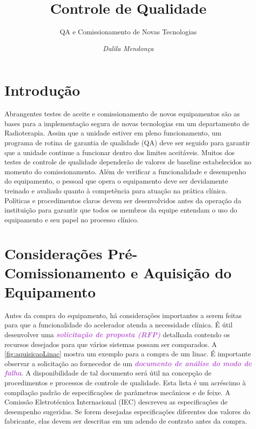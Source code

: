 \documentclass[11pt,a4paper]{article}
\title{\LobsterTwo\Huge{Controle de Qualidade}}
\author{\LobsterTwo\Large{QA e Comissionamento de Novas Tecnologias}\nocite{*}}
\date{\LobsterTwo\textit{Dalila Mendonça}}
\newcounter{exemplo}
\begin{document}
	\maketitle


\section{Introdução}

	Abrangentes testes de aceite e comissionamento de novos equipamentos são as bases para a implementação segura de novas tecnologias em um departamento de Radioterapia. Assim que a unidade estiver em pleno funcionamento, um programa de rotina de garantia de qualidade (QA) deve ser seguido para garantir que a unidade continue a funcionar dentro dos limites aceitáveis. Muitos dos testes de controle de qualidade dependerão de valores de baseline estabelecidos no momento do comissionamento. Além de verificar a funcionalidade e desempenho do equipamento, o pessoal que opera o equipamento deve ser devidamente treinado e avaliado quanto à competência para atuação na prática clínica. Políticas e procedimentos claros devem ser desenvolvidos antes da operação da instituição para garantir que todos os membros da equipe entendam o uso do equipamento e seu papel no processo clínico.

\section{Considerações Pré-Comissionamento e Aquisição do Equipamento}

	Antes da compra do equipamento, há considerações importantes a serem feitas para que a funcionalidade do acelerador atenda a necessidade clínica. É útil desenvolver uma \textcolor{MediumOrchid}{\textbf{\textit{solicitação de proposta (RFP)}}} detalhada contendo os recursos desejados para que vários sistemas possam ser comparados. A \ref{fig:aquisicaoLinac} mostra um exemplo para a compra de um linac. É importante observar a solicitação ao fornecedor de um \textcolor{MediumOrchid}{\textbf{\textit{documento de análise do modo de falha}}}. A disponibilidade de tal documento será útil na concepção de procedimentos e processos de controle de qualidade. Esta lista é um acréscimo à compilação padrão de especificações de parâmetros mecânicos e de feixe. A Comissão Eletrotécnica Internacional (IEC) descreveu as especificações de desempenho sugeridas. Se forem desejadas especificações diferentes dos valores do fabricante, elas devem ser descritas em um adendo de contrato antes da compra.
\end{document}
